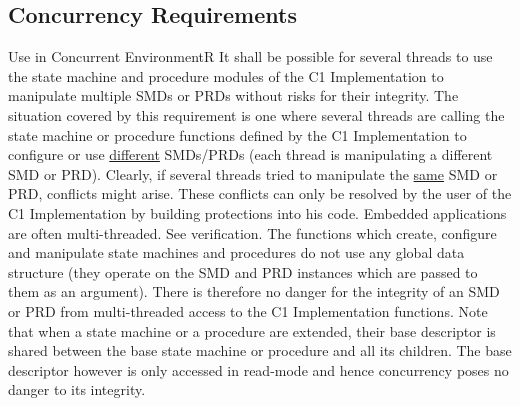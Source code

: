 \documentclass[requirements]{../fwprofile}
\begin{document}
\subsection{Concurrency Requirements}\label{req:concurrencyReqs}

\begin{fw_req_note}{Use in Concurrent Environment}{R}
{It shall be possible for several threads to use the state machine and procedure modules of the C1 Implementation to manipulate multiple SMDs or PRDs without risks for their integrity.}
{The situation covered by this requirement is one where several threads are calling the state machine or procedure functions defined by the C1 Implementation to configure or use \underline{different} SMDs/PRDs (each thread is manipulating a different SMD or PRD). Clearly, if several threads tried to manipulate the \underline{same} SMD or PRD, conflicts might arise. These conflicts can only be resolved by the user of the C1 Implementation by building protections into his code.
}
{Embedded applications are often multi-threaded.}
{See verification.} 
{The functions which create, configure and manipulate state machines 
and procedures do not use any global data structure (they operate on 
the SMD and PRD instances which are passed to them as an argument). 
There is therefore no danger for the integrity of an SMD or PRD from multi-threaded access to 
the C1 Implementation functions. 
Note that when a state machine or a procedure are extended, their base descriptor is shared
between the base state machine or procedure and all its children.
The base descriptor however is only accessed in read-mode and hence concurrency poses
no danger to its integrity.}
\end{fw_req_note}
\end{document}
